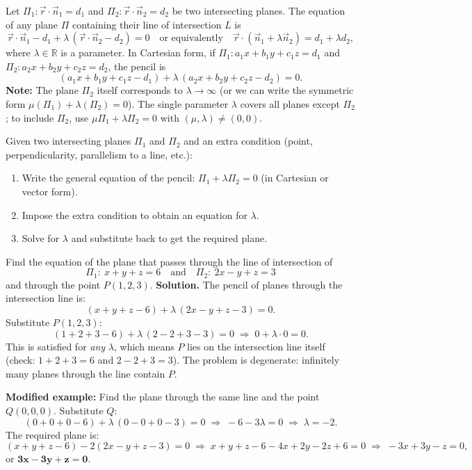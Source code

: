 \documentclass[11pt]{article}
\begin{document}
\begin{propriete}
Let $\Pi_1: \vec{r}\cdot\vec{n}_1 = d_1$ and $\Pi_2: \vec{r}\cdot\vec{n}_2 = d_2$ be two intersecting planes. The equation of any plane $\Pi$ containing their line of intersection $L$ is
\[ \vec{r}\cdot\vec{n}_1 - d_1 + \lambda\,(\vec{r}\cdot\vec{n}_2 - d_2) = 0 \quad\text{or equivalently}\quad \vec{r}\cdot(\vec{n}_1 + \lambda\vec{n}_2) = d_1 + \lambda d_2, \]
where $\lambda \in \mathbb{R}$ is a parameter.
In Cartesian form, if $\Pi_1: a_1x+b_1y+c_1z=d_1$ and $\Pi_2: a_2x+b_2y+c_2z=d_2$, the pencil is
\[ (a_1x+b_1y+c_1z-d_1) + \lambda\,(a_2x+b_2y+c_2z-d_2) = 0. \]
\textbf{Note:} The plane $\Pi_2$ itself corresponds to $\lambda \to \infty$ (or we can write the symmetric form $\mu(\Pi_1) + \lambda(\Pi_2) = 0$). The single parameter $\lambda$ covers all planes except $\Pi_2$; to include $\Pi_2$, use $\mu\Pi_1 + \lambda\Pi_2 = 0$ with $(\mu,\lambda) \neq (0,0)$.
\end{propriete}

\begin{methode}
Given two intersecting planes $\Pi_1$ and $\Pi_2$ and an extra condition (point, perpendicularity, parallelism to a line, etc.):
\begin{enumerate}
\item Write the general equation of the pencil: $\Pi_1 + \lambda\Pi_2 = 0$ (in Cartesian or vector form).
\item Impose the extra condition to obtain an equation for $\lambda$.
\item Solve for $\lambda$ and substitute back to get the required plane.
\end{enumerate}
\end{methode}

\begin{exoresolu}
Find the equation of the plane that passes through the line of intersection of
\[ \Pi_1:\ x + y + z = 6 \quad\text{and}\quad \Pi_2:\ 2x - y + z = 3 \]
and through the point $P(1,2,3)$.
\tcblower
\textbf{Solution.}
The pencil of planes through the intersection line is:
\[ (x + y + z - 6) + \lambda\,(2x - y + z - 3) = 0. \]
Substitute $P(1,2,3)$:
\[ (1+2+3-6) + \lambda\,(2-2+3-3) = 0 \;\Longrightarrow\; 0 + \lambda\cdot 0 = 0. \]
This is satisfied for \emph{any} $\lambda$, which means $P$ lies on the intersection line itself (check: $1+2+3=6$ and $2-2+3=3$). The problem is degenerate: infinitely many planes through the line contain $P$. 

\textbf{Modified example:} Find the plane through the same line and the point $Q(0,0,0)$.
Substitute $Q$:
\[ (0+0+0-6) + \lambda\,(0-0+0-3) = 0 \;\Longrightarrow\; -6 - 3\lambda = 0 \;\Longrightarrow\; \lambda = -2. \]
The required plane is:
\[ (x+y+z-6) - 2(2x-y+z-3) = 0 \;\Longrightarrow\; x+y+z-6 -4x+2y-2z+6 = 0 \;\Longrightarrow\; -3x + 3y - z = 0, \]
or $\mathbf{3x - 3y + z = 0}$.
\end{exoresolu}
\end{document}
